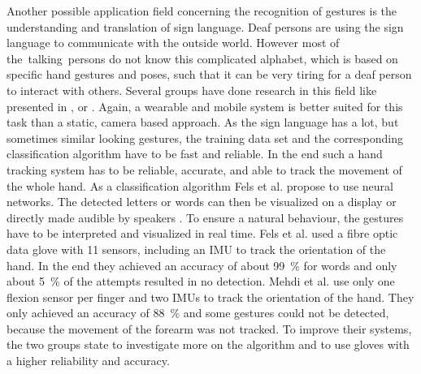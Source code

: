 Another possible application field concerning the recognition of gestures is the understanding and translation of sign language. Deaf persons are using the sign language to communicate with the outside world. However most of the~\grqq talking\grqq~persons do not know this complicated alphabet, which is based on specific hand gestures and poses, such that it can be very tiring for a deaf person to interact with others. Several groups have done research in this field like presented in \cite{mehdi2002sign}, \cite{fels1993glove} or \cite{dipietro2008survey}. Again, a wearable and mobile system is better suited for this task than a static, camera based approach. As the sign language has a lot, but sometimes similar looking gestures, the training data set and the corresponding classification algorithm have to be fast and reliable. In the end such a hand tracking system has to be reliable, accurate, and able to track the movement of the whole hand. As a classification algorithm Fels et al. propose to use neural networks. The detected letters or words can then be visualized on a display or directly made audible by speakers \cite{fels1993glove}. To ensure a natural behaviour, the gestures have to be interpreted and visualized in real time. Fels et al. used a fibre optic data glove with 11 sensors, including an IMU to track the orientation of the hand. In the end they achieved an accuracy of about \SI{99}{\percent} for words and only about \SI{5}{\percent} of the attempts resulted in no detection. Mehdi et al. use only one flexion sensor per finger and two IMUs to track the orientation of the hand. They only achieved an accuracy of \SI{88}{\percent} and some gestures could not be detected, because the movement of the forearm was not tracked. To improve their systems, the two groups state to investigate more on the algorithm and to use gloves with a higher reliability and accuracy.
